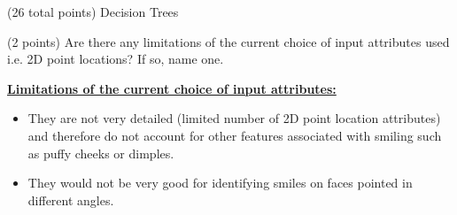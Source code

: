 \documentclass[12pt]{article}
\begin{document}
\begin{question}{(26 total points) Decision Trees}
\begin{subquestion}



\end{subquestion}



%
%
\begin{subquestion}{(2 points) 
Are there any limitations of the current choice of input attributes used i.e. 2D point locations? If so, name one. 
}


\begin{answerbox}{11em}
\large{\textbf{\underline{Limitations of the current choice of input attributes:}}}
\normalsize{
\begin{itemize}
    \item They are not very detailed (limited number of 2D point location attributes) and therefore do not account for other features associated with smiling such as puffy cheeks or dimples.
    \item They would not be very good for identifying smiles on faces pointed in different angles.
\end{itemize}
}
\end{answerbox}



\end{subquestion}


\end{question}




\clearpage
\end{document}
